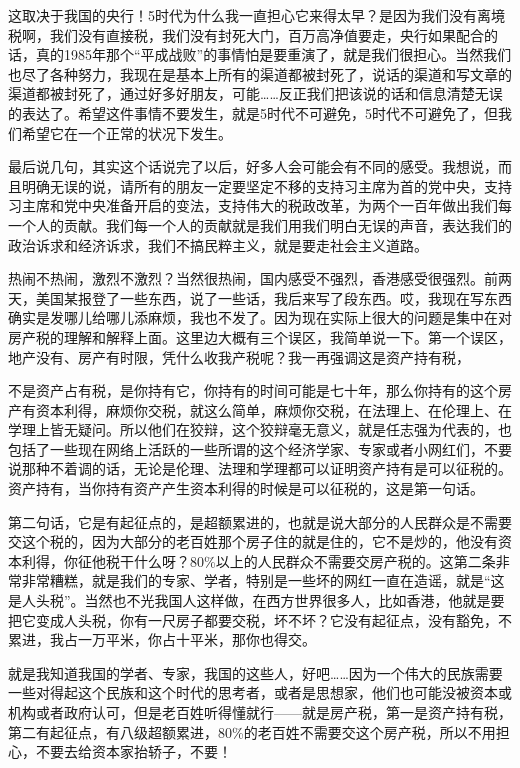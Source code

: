 \documentclass[UTF8, 12pt, a4paper]{ctexrep}
\begin{document}
这取决于我国的央行！5时代为什么我一直担心它来得太早？是因为我们没有离境税啊，我们没有直接税，我们没有封死大门，百万高净值要走，央行如果配合的话，真的1985年那个“平成战败”的事情怕是要重演了，就是我们很担心。当然我们也尽了各种努力，我现在是基本上所有的渠道都被封死了，说话的渠道和写文章的渠道都被封死了，通过好多好朋友，可能……反正我们把该说的话和信息清楚无误的表达了。希望这件事情不要发生，就是5时代不可避免，5时代不可避免了，但我们希望它在一个正常的状况下发生。

最后说几句，其实这个话说完了以后，好多人会可能会有不同的感受。我想说，而且明确无误的说，请所有的朋友一定要坚定不移的支持习主席为首的党中央，支持习主席和党中央准备开启的变法，支持伟大的税政改革，为两个一百年做出我们每一个人的贡献。我们每一个人的贡献就是我们用我们明白无误的声音，表达我们的政治诉求和经济诉求，我们不搞民粹主义，就是要走社会主义道路。

热闹不热闹，激烈不激烈？当然很热闹，国内感受不强烈，香港感受很强烈。前两天，美国某报登了一些东西，说了一些话，我后来写了段东西。哎，我现在写东西确实是发哪儿给哪儿添麻烦，我也不发了。因为现在实际上很大的问题是集中在对房产税的理解和解释上面。这里边大概有三个误区，我简单说一下。第一个误区，地产没有、房产有时限，凭什么收我产税呢？我一再强调这是资产持有税，

不是资产占有税，是你持有它，你持有的时间可能是七十年，那么你持有的这个房产有资本利得，麻烦你交税，就这么简单，麻烦你交税，在法理上、在伦理上、在学理上皆无疑问。所以他们在狡辩，这个狡辩毫无意义，就是任志强为代表的，也包括了一些现在网络上活跃的一些所谓的这个经济学家、专家或者小网红们，不要说那种不着调的话，无论是伦理、法理和学理都可以证明资产持有是可以征税的。资产持有，当你持有资产产生资本利得的时候是可以征税的，这是第一句话。

第二句话，它是有起征点的，是超额累进的，也就是说大部分的人民群众是不需要交这个税的，因为大部分的老百姓那个房子住的就是住的，它不是炒的，他没有资本利得，你征他税干什么呀？80\%以上的人民群众不需要交房产税的。这第二条非常非常糟糕，就是我们的专家、学者，特别是一些坏的网红一直在造谣，就是“这是人头税”。当然也不光我国人这样做，在西方世界很多人，比如香港，他就是要把它变成人头税，你有一尺房子都要交税，坏不坏？它没有起征点，没有豁免，不累进，我占一万平米，你占十平米，那你也得交。

就是我知道我国的学者、专家，我国的这些人，好吧……因为一个伟大的民族需要一些对得起这个民族和这个时代的思考者，或者是思想家，他们也可能没被资本或机构或者政府认可，但是老百姓听得懂就行——就是房产税，第一是资产持有税，第二有起征点，有八级超额累进，80\%的老百姓不需要交这个房产税，所以不用担心，不要去给资本家抬轿子，不要！
\end{document}
